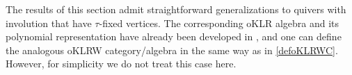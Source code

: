 \begin{remark}
\label{rem:extend}
    The results of this section admit straightforward generalizations to quivers with involution that have $\tau$-fixed vertices.  
The corresponding oKLR algebra and its polynomial representation have already been developed in \cite{Prz23}, and one can define the analogous oKLRW category/algebra in the same way as in \cref{defoKLRWC}. However, for simplicity we do not treat this case here.
\end{remark}